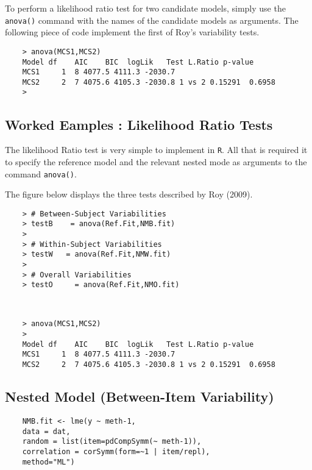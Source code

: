 \documentclass[12pt, a4paper]{report}
\theoremstyle{plain}
\theoremstyle{definition}
\theoremstyle{remark}
\begin{document}
To perform a likelihood ratio test for two candidate models, simply use the \texttt{anova()} command with the names of the candidate models as arguments. The following piece of code implement the first of Roy's variability tests.

\begin{framed}
	\begin{verbatim}
	> anova(MCS1,MCS2)
	Model df    AIC    BIC  logLik   Test L.Ratio p-value
	MCS1     1  8 4077.5 4111.3 -2030.7
	MCS2     2  7 4075.6 4105.3 -2030.8 1 vs 2 0.15291  0.6958
	>
	\end{verbatim}
\end{framed}

\subsection{Worked Eamples : Likelihood Ratio Tests}


The likelihood Ratio test is very simple to implement in \texttt{R}. All that is required it to specify the reference model and the relevant nested mode as arguments to the command \texttt{anova()}.

The figure below displays the three tests described by Roy (2009).

\begin{framed}
	\begin{verbatim}
	> # Between-Subject Variabilities
	> testB    = anova(Ref.Fit,NMB.fit) 
	>         
	> # Within-Subject Variabilities                
	> testW   = anova(Ref.Fit,NMW.fit) 
	>                       
	> # Overall Variabilities
	> testO     = anova(Ref.Fit,NMO.fit)                        
	
	
	\end{verbatim}
\end{framed}
\begin{framed}   
	\begin{verbatim}
	> anova(MCS1,MCS2)
	>
	Model df    AIC    BIC  logLik   Test L.Ratio p-value
	MCS1     1  8 4077.5 4111.3 -2030.7
	MCS2     2  7 4075.6 4105.3 -2030.8 1 vs 2 0.15291  0.6958
	\end{verbatim}
\end{framed}

\subsection{Nested Model (Between-Item Variability)}
\begin{framed}
	\begin{verbatim}
	NMB.fit <- lme(y ~ meth-1, 
	data = dat, 
	random = list(item=pdCompSymm(~ meth-1)),
	correlation = corSymm(form=~1 | item/repl), 
	method="ML")
	\end{verbatim}
\end{framed}



\end{document}
